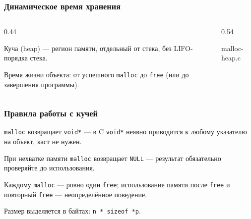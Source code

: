 \documentclass[compress, 8pt, aspectratio=169]{beamer}
\begin{document}
\begin{frame}[fragile]

    \frametitle{Динамическое время хранения}

    \begin{columns}[T]

        \begin{column}{0.44\textwidth}

            \begin{myitemize}
                \footnotesize

                \item Куча (heap) --- регион памяти,
                    отдельный от стека, без
                    LIFO-порядка стека.

                \item Время жизни объекта: от успешного
                    \texttt{malloc} до \texttt{free}
                    (или до завершения программы).

            \end{myitemize}

        \end{column}

        \begin{column}{0.54\textwidth}

                {malloc-heap.c}

        \end{column}

    \end{columns}

\end{frame}

\begin{frame}

    \frametitle{Правила работы с кучей}

    \begin{myitemize}

        \item \texttt{malloc} возвращает \texttt{void*} ---
            в C \texttt{void*} неявно приводится к любому
            указателю на объект, каст не нужен.

        \item При нехватке памяти \texttt{malloc}
            возвращает \texttt{NULL} --- результат
            обязательно проверяйте до использования.

        \item Каждому \texttt{malloc} --- ровно один
            \texttt{free}; использование памяти после
            \texttt{free} и повторный \texttt{free} ---
            неопределённое поведение.

        \item Размер выделяется в байтах:
            \texttt{n * sizeof *p}.

    \end{myitemize}

\end{frame}
\end{document}
